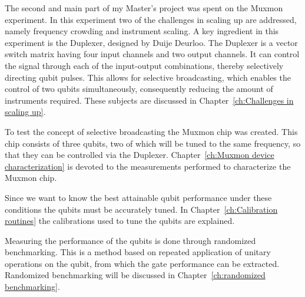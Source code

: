 \documentclass[12pt]{report}
\begin{document}
  The second and main part of my Master's project was spent on the Muxmon experiment. In this experiment two of the challenges in scaling up are addressed, namely frequency crowding and instrument scaling. A key ingredient in this experiment is the Duplexer, designed by Duije Deurloo. The Duplexer is a vector switch matrix having four input channels and two output channels. It can control the signal through each of the input-output combinations, thereby selectively directing qubit pulses. This allows for selective broadcasting, which enables the control of two qubits simultaneously, consequently reducing the amount of instruments required. These subjects are discussed in Chapter~\ref{ch:Challenges in scaling up}.

  To test the concept of selective broadcasting the Muxmon chip was created. This chip consists of three qubits, two of which will be tuned to the same frequency, so that they can be controlled via the Duplexer. Chapter~\ref{ch:Muxmon device characterization} is devoted to the measurements performed to characterize the Muxmon chip.

  Since we want to know the best attainable qubit performance under these conditions the qubits must be accurately tuned. In Chapter~\ref{ch:Calibration routines} the calibrations used to tune the qubits are explained.

  Measuring the performance of the qubits is done through randomized benchmarking. This is a method based on repeated application of unitary operations on the qubit, from which the gate performance can be extracted. Randomized benchmarking will be discussed in Chapter~\ref{ch:randomized benchmarking}.







\begin{appendices}



\end{appendices}



\end{document}
